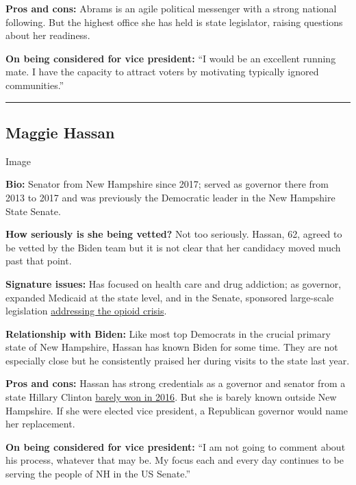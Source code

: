 \textbf{Pros and cons:} Abrams is an agile political messenger with a
strong national following. But the highest office she has held is state
legislator, raising questions about her readiness.

\textbf{On being considered for vice president:} ``I would be an
excellent running mate. I have the capacity to attract voters by
motivating typically ignored communities.''

\begin{center}\rule{0.5\linewidth}{\linethickness}\end{center}

\hypertarget{maggie-hassan}{%
\subsection{Maggie Hassan}\label{maggie-hassan}}

Image

\textbf{Bio:} Senator from New Hampshire since 2017; served as governor
there from 2013 to 2017 and was previously the Democratic leader in the
New Hampshire State Senate.

\textbf{How seriously is she being vetted?} Not too seriously. Hassan,
62, agreed to be vetted by the Biden team but it is not clear that her
candidacy moved much past that point.

\textbf{Signature issues:} Has focused on health care and drug
addiction; as governor, expanded Medicaid at the state level, and in the
Senate, sponsored large-scale legislation
\href{https://www.nytimes.com/2018/03/19/us/politics/trump-new-hampshire-opioid-plan.html}{addressing
the opioid crisis}.

\textbf{Relationship with Biden:} Like most top Democrats in the crucial
primary state of New Hampshire, Hassan has known Biden for some time.
They are not especially close but he consistently praised her during
visits to the state last year.

\textbf{Pros and cons:} Hassan has strong credentials as a governor and
senator from a state Hillary Clinton
\href{https://www.nytimes.com/2016/11/09/us/politics/new-hampshire-senate-hassan-ayotte.html}{barely
won in 2016}. But she is barely known outside New Hampshire. If she were
elected vice president, a Republican governor would name her
replacement.

\textbf{On being considered for vice president:} ``I am not going to
comment about his process, whatever that may be. My focus each and every
day continues to be serving the people of NH in the US Senate.''

